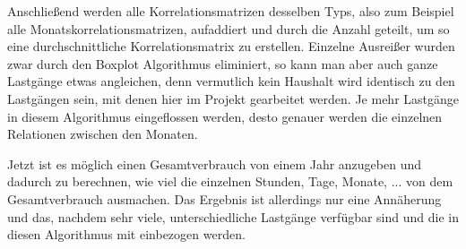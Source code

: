 
Anschließend werden alle Korrelationsmatrizen desselben Typs, also zum Beispiel alle Monatskorrelationsmatrizen, aufaddiert und durch die Anzahl geteilt, um so eine durchschnittliche Korrelationsmatrix zu erstellen. Einzelne Ausreißer wurden zwar durch den Boxplot Algorithmus eliminiert, so kann man aber auch ganze Lastgänge etwas angleichen, denn vermutlich kein Haushalt wird identisch zu den Lastgängen sein, mit denen hier im Projekt gearbeitet werden. Je mehr Lastgänge in diesem Algorithmus eingeflossen werden, desto genauer werden die einzelnen Relationen zwischen den Monaten.

Jetzt ist es möglich einen Gesamtverbrauch von einem Jahr anzugeben und dadurch zu berechnen, wie viel die einzelnen Stunden, Tage, Monate, ... von dem Gesamtverbrauch ausmachen. Das Ergebnis ist allerdings nur eine Annäherung und das, nachdem sehr viele, unterschiedliche Lastgänge verfügbar sind und die in diesen Algorithmus mit einbezogen werden.